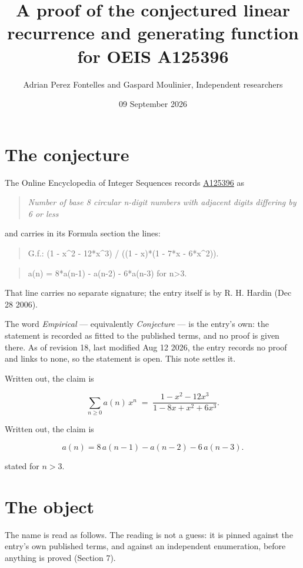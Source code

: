 \documentclass[11pt]{article}
\title{A proof of the conjectured linear recurrence and generating function for OEIS A125396}
\author{Adrian Perez Fontelles and Gaspard Moulinier, Independent researchers}
\date{09 September 2026}
\theoremstyle{definition}
\begin{document}
\maketitle
\section{The conjecture}

The Online Encyclopedia of Integer Sequences records \href{https://oeis.org/A125396}{A125396} as

\begin{quote}\itshape Number of base 8 circular n-digit numbers with adjacent digits differing by 6 or less\end{quote}

and carries in its Formula section the lines:

\begin{quote}\ttfamily G.f.: (1 - x\textasciicircum{}2 - 12*x\textasciicircum{}3) / ((1 - x)*(1 - 7*x - 6*x\textasciicircum{}2)).\end{quote}

\begin{quote}\ttfamily a(n) = 8*a(n-1) - a(n-2) - 6*a(n-3) for n>3.\end{quote}

That line carries no separate signature; the entry itself is by R. H. Hardin (Dec 28 2006).

The word {\itshape Empirical} --- equivalently {\itshape Conjecture} --- is the entry's own: the statement is recorded as fitted to the published terms, and no proof is given there. As of revision 18, last modified Aug 12 2026, the entry records no proof and links to none, so the statement is open. This note settles it.

Written out, the claim is

\[\sum_{n \ge 0} a(n)\,x^n \;=\; \frac{1 - x^{2} - 12x^{3}}{1 - 8x + x^{2} + 6x^{3}}.\]

Written out, the claim is

\[a(n) = 8\,a(n-1) - a(n-2) - 6\,a(n-3).\]

stated for $n > 3$.

\section{The object}

The name is read as follows. The reading is not a guess: it is pinned against the entry's own published terms, and against an independent enumeration, before anything is proved (Section 7).
\end{document}
